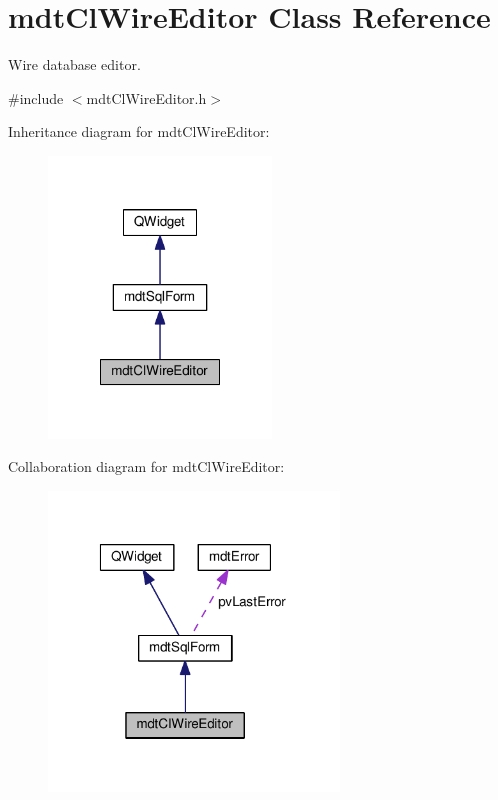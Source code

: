 \hypertarget{classmdt_cl_wire_editor}{\section{mdt\-Cl\-Wire\-Editor Class Reference}
\label{classmdt_cl_wire_editor}
}


Wire database editor.  




{\ttfamily \#include $<$mdt\-Cl\-Wire\-Editor.\-h$>$}



Inheritance diagram for mdt\-Cl\-Wire\-Editor\-:
\nopagebreak
\begin{figure}[H]
\begin{center}
\leavevmode
\includegraphics[width=168pt]{classmdt_cl_wire_editor__inherit__graph}
\end{center}
\end{figure}


Collaboration diagram for mdt\-Cl\-Wire\-Editor\-:
\nopagebreak
\begin{figure}[H]
\begin{center}
\leavevmode
\includegraphics[width=219pt]{classmdt_cl_wire_editor__coll__graph}
\end{center}
\end{figure}
